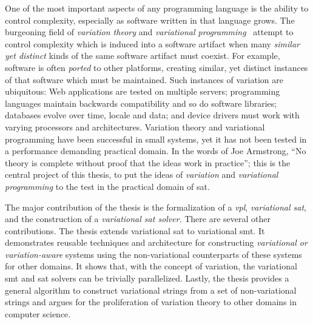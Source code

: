 One of the most important aspects of any programming language is the ability to
control complexity, especially as software written in that language grows. The
burgeoning field of \emph{variation theory} and \emph{variational
  programming}~\cite{EW11gttse,EW11tosem,HW16fosd,CEW16ecoop,Walk14onward}
attempt to control complexity which is induced into a software artifact when
many \emph{similar yet distinct} kinds of the same software artifact must
coexist. For example, software is often \emph{ported} to other platforms,
creating similar, yet distinct instances of that software which must be
maintained. Such instances of variation are ubiquitous: Web applications are
tested on multiple servers; programming languages maintain backwards
compatibility and so do software libraries; databases evolve over time, locale
and data; and device drivers must work with varying processors and
architectures. Variation theory and variational programming have been successful
in small systems, yet it has
not been tested in a performance demanding practical domain. In the words of Joe
Armstrong\cite{armstrongThesis}, ``No theory is complete without proof that the
ideas work in practice''; this is the central project of this thesis, to put the
ideas of \emph{variation} and \emph{variational programming} to the test in the
practical domain of \ac{sat}.

The major contribution of the thesis is the formalization of a \emph{\ac{vpl}},
\emph{variational \acl{sat}}, and the construction of a \emph{variational
  \ac{sat} solver}. There are several other contributions. The thesis extends
variational \acl{sat} to variational \ac{smt}. It demonstrates reusable
techniques and architecture for constructing \emph{variational or
  variation-aware} systems using the non-variational counterparts of these
systems for other domains. It shows that, with the concept of variation, the
variational \ac{smt} and \ac{sat} solvers can be trivially parallelized. Lastly,
the thesis provides a general algorithm to construct variational strings from a
set of non-variational strings and argues for the proliferation of variation
theory to other domains in computer science.

